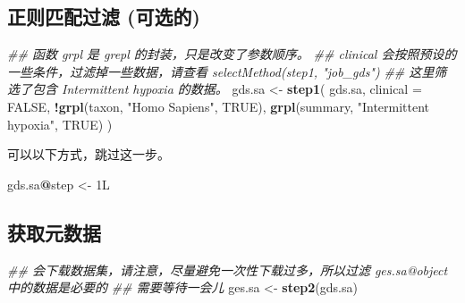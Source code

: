 \documentclass[
]{article}
\newenvironment{Shaded}{\begin{snugshade}}{\end{snugshade}}
\newcommand{\CommentTok}[1]{\textcolor[rgb]{0.56,0.35,0.01}{\textit{#1}}}
\newcommand{\DataTypeTok}[1]{\textcolor[rgb]{0.13,0.29,0.53}{#1}}
\newcommand{\KeywordTok}[1]{\textcolor[rgb]{0.13,0.29,0.53}{\textbf{#1}}}
\newcommand{\NormalTok}[1]{#1}
\newcommand{\OperatorTok}[1]{\textcolor[rgb]{0.81,0.36,0.00}{\textbf{#1}}}
\newcommand{\OtherTok}[1]{\textcolor[rgb]{0.56,0.35,0.01}{#1}}
\newcommand{\StringTok}[1]{\textcolor[rgb]{0.31,0.60,0.02}{#1}}
\begin{document}
\hypertarget{ux6b63ux5219ux5339ux914dux8fc7ux6ee4-ux53efux9009ux7684}{%
\subsection{正则匹配过滤 (可选的)}\label{ux6b63ux5219ux5339ux914dux8fc7ux6ee4-ux53efux9009ux7684}}

\begin{Shaded}
\begin{Highlighting}[]
\CommentTok{\#\# 函数 \textasciigrave{}grpl\textasciigrave{} 是 \textasciigrave{}grepl\textasciigrave{} 的封装，只是改变了参数顺序。 }
\CommentTok{\#\# clinical 会按照预设的一些条件，过滤掉一些数据，请查看 \textasciigrave{}selectMethod(step1, "job\_gds")\textasciigrave{}}
\CommentTok{\#\# 这里筛选了包含 \textasciigrave{}Intermittent hypoxia\textasciigrave{} 的数据。}
\NormalTok{gds.sa \textless{}{-}}\StringTok{ }\KeywordTok{step1}\NormalTok{(}
\NormalTok{  gds.sa, }\DataTypeTok{clinical =} \OtherTok{FALSE}\NormalTok{, }\OperatorTok{!}\KeywordTok{grpl}\NormalTok{(taxon, }\StringTok{"Homo Sapiens"}\NormalTok{, }\OtherTok{TRUE}\NormalTok{),}
  \KeywordTok{grpl}\NormalTok{(summary, }\StringTok{"Intermittent hypoxia"}\NormalTok{, }\OtherTok{TRUE}\NormalTok{)}
\NormalTok{)}
\end{Highlighting}
\end{Shaded}

可以以下方式，跳过这一步。

\begin{Shaded}
\begin{Highlighting}[]
\NormalTok{gds.sa}\OperatorTok{@}\NormalTok{step \textless{}{-}}\StringTok{ }\NormalTok{1L}
\end{Highlighting}
\end{Shaded}

\hypertarget{ux83b7ux53d6ux5143ux6570ux636e}{%
\subsection{获取元数据}\label{ux83b7ux53d6ux5143ux6570ux636e}}

\begin{Shaded}
\begin{Highlighting}[]
\CommentTok{\#\# 会下载数据集，请注意，尽量避免一次性下载过多，所以过滤 \textasciigrave{}ges.sa@object\textasciigrave{} 中的数据是必要的}
\CommentTok{\#\# 需要等待一会儿}
\NormalTok{ges.sa \textless{}{-}}\StringTok{ }\KeywordTok{step2}\NormalTok{(gds.sa)}
\end{Highlighting}
\end{Shaded}
\end{document}
